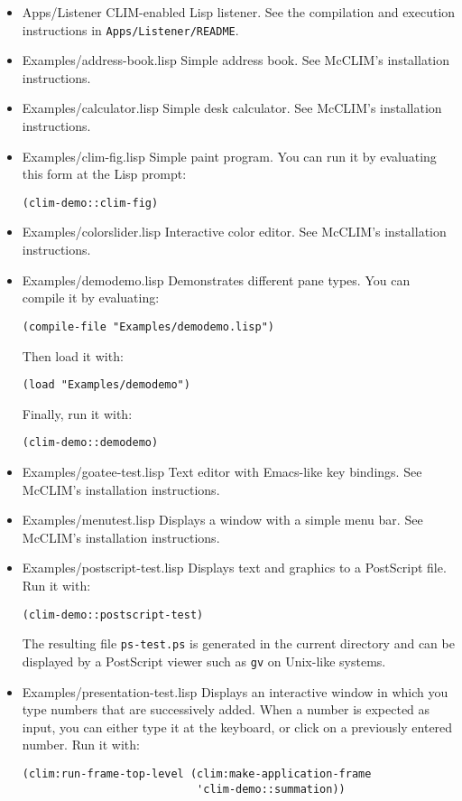 \begin{itemize}
\item Apps/Listener
CLIM-enabled Lisp listener.  See the compilation and execution
instructions in \texttt{Apps/Listener/README}.
\item Examples/address-book.lisp
Simple address book.  See McCLIM's installation instructions.
\item Examples/calculator.lisp
Simple desk calculator.  See McCLIM's installation instructions.
\item Examples/clim-fig.lisp
Simple paint program.  You can run it by evaluating this form at the
Lisp prompt:
\begin{verbatim}
(clim-demo::clim-fig)
\end{verbatim}
\item Examples/colorslider.lisp
Interactive color editor.  See McCLIM's installation instructions.
\item Examples/demodemo.lisp
Demonstrates different pane types.  You can compile it by evaluating:
\begin{verbatim}
(compile-file "Examples/demodemo.lisp")
\end{verbatim}
Then load it with:
\begin{verbatim}
(load "Examples/demodemo")
\end{verbatim}
Finally, run it with:
\begin{verbatim}
(clim-demo::demodemo)
\end{verbatim}
\item Examples/goatee-test.lisp
Text editor with Emacs-like key bindings.  See McCLIM's installation
instructions.
\item Examples/menutest.lisp
Displays a window with a simple menu bar.  See McCLIM's installation
instructions.
\item Examples/postscript-test.lisp
Displays text and graphics to a PostScript file.  Run it with:
\begin{verbatim}
(clim-demo::postscript-test)
\end{verbatim}
The resulting file \texttt{ps-test.ps} is generated in the current directory
and can be displayed by a PostScript viewer such as \texttt{gv} on Unix-like
systems.
\item Examples/presentation-test.lisp
Displays an interactive window in which you type numbers that are
successively added.  When a number is expected as input, you can either
type it at the keyboard, or click on a previously entered number. Run it
with:
\begin{verbatim}
(clim:run-frame-top-level (clim:make-application-frame
                           'clim-demo::summation))
\end{verbatim}


\end{itemize}
